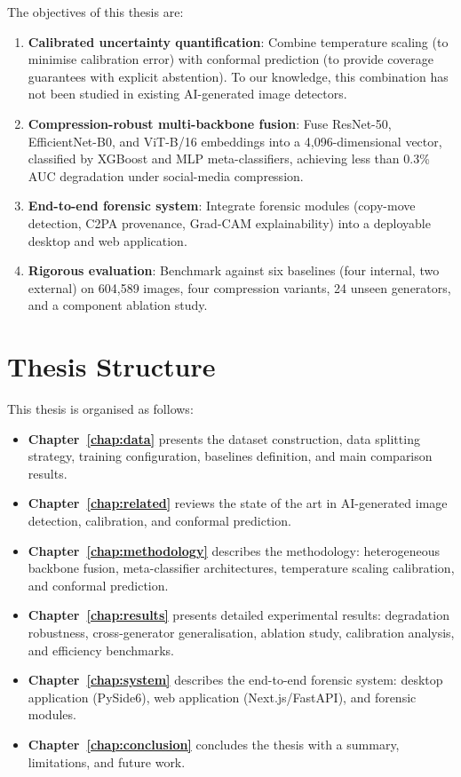 The objectives of this thesis are:
\begin{enumerate}
    \item \textbf{Calibrated uncertainty quantification}: Combine temperature scaling (to minimise calibration error) with conformal prediction (to provide coverage guarantees with explicit abstention). To our knowledge, this combination has not been studied in existing AI-generated image detectors.
    \item \textbf{Compression-robust multi-backbone fusion}: Fuse ResNet-50, EfficientNet-B0, and ViT-B/16 embeddings into a 4,096-dimensional vector, classified by XGBoost and MLP meta-classifiers, achieving less than 0.3\% AUC degradation under social-media compression.
    \item \textbf{End-to-end forensic system}: Integrate forensic modules (copy-move detection, C2PA provenance, Grad-CAM explainability) into a deployable desktop and web application.
    \item \textbf{Rigorous evaluation}: Benchmark against six baselines (four internal, two external) on 604,589 images, four compression variants, 24 unseen generators, and a component ablation study.
\end{enumerate}

\section{Thesis Structure}\label{sec:structure}

This thesis is organised as follows:
\begin{itemize}
    \item \textbf{Chapter~\ref{chap:data}} presents the dataset construction, data splitting strategy, training configuration, baselines definition, and main comparison results.
    \item \textbf{Chapter~\ref{chap:related}} reviews the state of the art in AI-generated image detection, calibration, and conformal prediction.
    \item \textbf{Chapter~\ref{chap:methodology}} describes the methodology: heterogeneous backbone fusion, meta-classifier architectures, temperature scaling calibration, and conformal prediction.
    \item \textbf{Chapter~\ref{chap:results}} presents detailed experimental results: degradation robustness, cross-generator generalisation, ablation study, calibration analysis, and efficiency benchmarks.
    \item \textbf{Chapter~\ref{chap:system}} describes the end-to-end forensic system: desktop application (PySide6), web application (Next.js/FastAPI), and forensic modules.
    \item \textbf{Chapter~\ref{chap:conclusion}} concludes the thesis with a summary, limitations, and future work.
\end{itemize}
